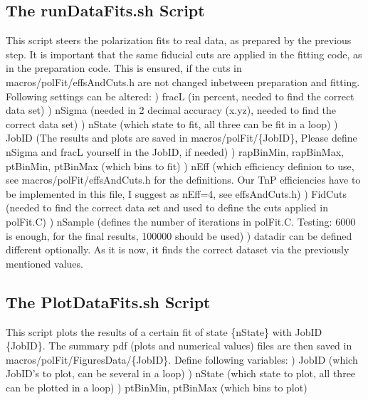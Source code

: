 \documentclass{article}
\begin{document}
\subsection{The runDataFits.sh Script}

This script steers the polarization fits to real data, as prepared by the previous step. It is important that the same fiducial cuts are applied in the fitting code, as in the preparation code. This is ensured, if the cuts in macros/polFit/effsAndCuts.h are not changed inbetween preparation and fitting. Following settings can be altered:
\newline *) fracL (in percent, needed to find the correct data set)
\newline *) nSigma (needed in 2 decimal accuracy (x.yz), needed to find the correct data set)
\newline *) nState (which state to fit, all three can be fit in a loop)
\newline *) JobID (The results and plots are saved in macros/polFit/\{JobID\}, Please define nSigma and fracL yourself in the JobID, if needed)
\newline *) rapBinMin, rapBinMax, ptBinMin, ptBinMax (which bins to fit)
\newline *) nEff (which efficiency definion to use, see macros/polFit/effsAndCuts.h for the definitions. Our TnP efficiencies have to be implemented in this file, I suggest as nEff=4, see effsAndCuts.h)
\newline *) FidCuts (needed to find the correct data set and used to define the cuts applied in polFit.C)
\newline *) nSample (defines the number of iterations in polFit.C. Testing: 6000 is enough, for the final results, 100000 should be used)
\newline *) datadir can be defined different optionally. As it is now, it finds the correct dataset via the previously mentioned values.

\subsection{The PlotDataFits.sh Script}

This script plots the results of a certain fit of state \{nState\} with JobID \{JobID\}. The summary pdf (plots and numerical values) files are then saved in macros/polFit/FiguresData/\{JobID\}. Define following variables:
\newline *) JobID (which JobID's to plot, can be several in a loop)
\newline *) nState (which state to plot, all three can be plotted in a loop)
\newline *) ptBinMin, ptBinMax (which bins to plot)
\end{document}
